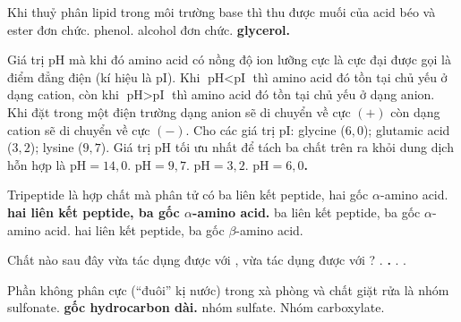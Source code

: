 \documentclass[11pt,a4paper]{article}
\begin{document}
\begin{ex}
Khi thuỷ phân lipid trong môi trường base thì thu được muối của acid béo và
\choice
{ester đơn chức.}
{phenol.}
{alcohol đơn chức.}
{\textbf{\color{hfRed}glycerol.}}
\end{ex}
\begin{ex}
Giá trị pH mà khi đó amino acid có nồng độ ion lưỡng cực là cực đại được gọi là điểm đẳng điện (kí hiệu là pI). Khi $\text{pH} < \text{pI}$ thì amino acid đó tồn tại chủ yếu ở dạng cation, còn khi $\text{pH} > \text{pI}$ thì amino acid đó tồn tại chủ yếu ở dạng anion. Khi đặt trong một điện trường dạng anion sẽ di chuyển về cực $(+)$ còn dạng cation sẽ di chuyển về cực $(-)$. Cho các giá trị pI: glycine ($6{,}0$); glutamic acid ($3{,}2$); lysine ($9{,}7$). Giá trị pH tối ưu nhất để tách ba chất trên ra khỏi dung dịch hỗn hợp là
\choice
{$\text{pH} = 14{,}0$.}
{$\text{pH} = 9{,}7$.}
{$\text{pH} = 3{,}2$.}
{\textbf{\color{hfRed}$\text{pH} = 6{,}0$.}}
\end{ex}
\begin{ex}
Tripeptide là hợp chất mà phân tử có
\choice
{ba liên kết peptide, hai gốc $\alpha$-amino acid.}
{\textbf{\color{hfRed}hai liên kết peptide, ba gốc $\alpha$-amino acid.}}
{ba liên kết peptide, ba gốc $\alpha$-amino acid.}
{hai liên kết peptide, ba gốc $\beta$-amino acid.}
\end{ex}
\begin{ex}
Chất nào sau đây vừa tác dụng được với , vừa tác dụng được với ?
\choice
{.}
{\textbf{\color{hfRed}.}}
{.}
{.}
\end{ex}
\begin{ex}
Phần không phân cực (``đuôi'' kị nước) trong xà phòng và chất giặt rửa là
\choice
{nhóm sulfonate.}
{\textbf{\color{hfRed}gốc hydrocarbon dài.}}
{nhóm sulfate.}
{Nhóm carboxylate.}
\end{ex}
\end{document}
